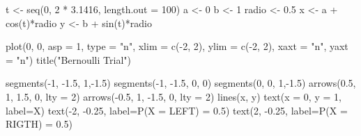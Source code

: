 \documentclass[
]{article}
\newenvironment{Shaded}{\begin{snugshade}}{\end{snugshade}}
\newcommand{\AttributeTok}[1]{\textcolor[rgb]{0.77,0.63,0.00}{#1}}
\newcommand{\DecValTok}[1]{\textcolor[rgb]{0.00,0.00,0.81}{#1}}
\newcommand{\FloatTok}[1]{\textcolor[rgb]{0.00,0.00,0.81}{#1}}
\newcommand{\FunctionTok}[1]{\textcolor[rgb]{0.00,0.00,0.00}{#1}}
\newcommand{\NormalTok}[1]{#1}
\newcommand{\OtherTok}[1]{\textcolor[rgb]{0.56,0.35,0.01}{#1}}
\newcommand{\SpecialCharTok}[1]{\textcolor[rgb]{0.00,0.00,0.00}{#1}}
\newcommand{\StringTok}[1]{\textcolor[rgb]{0.31,0.60,0.02}{#1}}
\begin{document}
\begin{Shaded}
\begin{Highlighting}[]
\NormalTok{t }\OtherTok{\textless{}{-}} \FunctionTok{seq}\NormalTok{(}\DecValTok{0}\NormalTok{, }\DecValTok{2} \SpecialCharTok{*} \FloatTok{3.1416}\NormalTok{, }\AttributeTok{length.out =} \DecValTok{100}\NormalTok{)}
\NormalTok{a }\OtherTok{\textless{}{-}} \DecValTok{0} 
\NormalTok{b }\OtherTok{\textless{}{-}} \DecValTok{1} 
\NormalTok{radio }\OtherTok{\textless{}{-}} \FloatTok{0.5}
\NormalTok{x }\OtherTok{\textless{}{-}}\NormalTok{ a }\SpecialCharTok{+} \FunctionTok{cos}\NormalTok{(t)}\SpecialCharTok{*}\NormalTok{radio}
\NormalTok{y }\OtherTok{\textless{}{-}}\NormalTok{ b }\SpecialCharTok{+} \FunctionTok{sin}\NormalTok{(t)}\SpecialCharTok{*}\NormalTok{radio}

\FunctionTok{plot}\NormalTok{(}\DecValTok{0}\NormalTok{, }\DecValTok{0}\NormalTok{, }\AttributeTok{asp =} \DecValTok{1}\NormalTok{, }\AttributeTok{type =} \StringTok{"n"}\NormalTok{, }\AttributeTok{xlim =} \FunctionTok{c}\NormalTok{(}\SpecialCharTok{{-}}\DecValTok{2}\NormalTok{, }\DecValTok{2}\NormalTok{), }\AttributeTok{ylim =} \FunctionTok{c}\NormalTok{(}\SpecialCharTok{{-}}\DecValTok{2}\NormalTok{, }\DecValTok{2}\NormalTok{), }\AttributeTok{xaxt =} \StringTok{"n"}\NormalTok{, }\AttributeTok{yaxt =} \StringTok{"n"}\NormalTok{)}
\FunctionTok{title}\NormalTok{(}\StringTok{"Bernoulli Trial"}\NormalTok{)}



\FunctionTok{segments}\NormalTok{(}\SpecialCharTok{{-}}\DecValTok{1}\NormalTok{, }\SpecialCharTok{{-}}\FloatTok{1.5}\NormalTok{, }\DecValTok{1}\NormalTok{,}\SpecialCharTok{{-}}\FloatTok{1.5}\NormalTok{)}
\FunctionTok{segments}\NormalTok{(}\SpecialCharTok{{-}}\DecValTok{1}\NormalTok{, }\SpecialCharTok{{-}}\FloatTok{1.5}\NormalTok{, }\DecValTok{0}\NormalTok{, }\DecValTok{0}\NormalTok{)}
\FunctionTok{segments}\NormalTok{(}\DecValTok{0}\NormalTok{, }\DecValTok{0}\NormalTok{, }\DecValTok{1}\NormalTok{,}\SpecialCharTok{{-}}\FloatTok{1.5}\NormalTok{)}
\FunctionTok{arrows}\NormalTok{(}\FloatTok{0.5}\NormalTok{, }\DecValTok{1}\NormalTok{, }\FloatTok{1.5}\NormalTok{, }\DecValTok{0}\NormalTok{, }\AttributeTok{lty =} \DecValTok{2}\NormalTok{)}
\FunctionTok{arrows}\NormalTok{(}\SpecialCharTok{{-}}\FloatTok{0.5}\NormalTok{, }\DecValTok{1}\NormalTok{, }\SpecialCharTok{{-}}\FloatTok{1.5}\NormalTok{, }\DecValTok{0}\NormalTok{, }\AttributeTok{lty =} \DecValTok{2}\NormalTok{)}
\FunctionTok{lines}\NormalTok{(x, y)}
\FunctionTok{text}\NormalTok{(}\AttributeTok{x =} \DecValTok{0}\NormalTok{, }\AttributeTok{y =} \DecValTok{1}\NormalTok{, }\AttributeTok{label=}\StringTok{\textquotesingle{}X\textquotesingle{}}\NormalTok{)}
\FunctionTok{text}\NormalTok{(}\SpecialCharTok{{-}}\DecValTok{2}\NormalTok{, }\SpecialCharTok{{-}}\FloatTok{0.25}\NormalTok{, }\AttributeTok{label=}\StringTok{\textquotesingle{}P(X = LEFT) = 0.5\textquotesingle{}}\NormalTok{)}
\FunctionTok{text}\NormalTok{(}\DecValTok{2}\NormalTok{, }\SpecialCharTok{{-}}\FloatTok{0.25}\NormalTok{, }\AttributeTok{label=}\StringTok{\textquotesingle{}P(X = RIGTH) = 0.5\textquotesingle{}}\NormalTok{)}
\end{Highlighting}
\end{Shaded}
\end{document}
